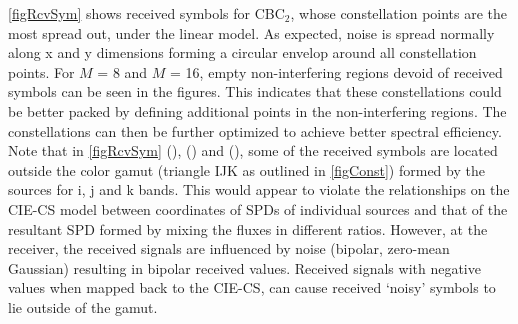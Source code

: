 \figurename{ \ref{figRcvSym}} shows received symbols for CBC$_{2}$, whose constellation points are the most spread out, under the linear model. As expected, noise is spread normally along x and y dimensions forming a circular envelop around all constellation points. For $M$ = 8 and $M$ = 16, empty non-interfering regions devoid of received symbols can be seen in the figures. This indicates that these constellations could be better packed by defining additional points in the non-interfering regions. The constellations can then be further optimized to achieve better spectral efficiency. Note that in \figurename{ \ref{figRcvSym}} (), () and (), some of the received symbols are located outside the color gamut (triangle IJK as outlined in \figurename{ }\ref{figConst}) formed by the sources for i, j and k bands. This would appear to violate the relationships on the CIE-CS model between coordinates of SPDs of individual sources and that of the resultant SPD formed by mixing the fluxes in different ratios. However, at the receiver, the received signals are influenced by noise (bipolar, zero-mean Gaussian) resulting in bipolar received values. Received signals with negative values when mapped back to the CIE-CS, can cause received `noisy' symbols to lie outside of the gamut.
